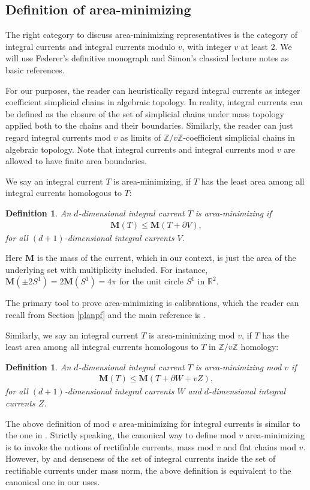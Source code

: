 \documentclass[11pt,a4paper]{amsart}
\numberwithin{equation}{section}
\newcommand{\ms}{\mathbf{M}}
\newcommand{\pd}{\partial}
\newcommand{\R}{\mathbb{R}}
\newcommand{\Z}{\mathbb{Z}}
\theoremstyle{plain}
\newtheorem{defn}[exam]{Definition}
\theoremstyle{definition}
\numberwithin{equation}{subsection}
\begin{document}
\subsection{Definition of area-minimizing}
	The right category to discuss area-minimizing representatives is the category of integral currents and integral currents modulo $v$, with integer $v$ at least $2$.  We will use Federer's definitive monograph \cite{HF} and Simon's classical lecture notes \cite{LS} as basic references. 
	
	For our purposes, the reader can heuristically regard integral currents as integer coefficient simplicial chains in algebraic topology. In reality, integral currents can be defined \cite[4.1.24]{HF} as the closure of the set of simplicial chains under mass topology applied both to the chains and their boundaries. Similarly,  the reader can just regard integral currents mod $v$ as limits of $\Z/v\Z$-coefficient simplicial chains in algebraic topology. Note that integral currents and integral currents mod $v$ are allowed to have finite area boundaries.
	
	We say an integral current $T$ is area-minimizing, if $T$ has the least area among all integral currents homologous to $T$:
	\begin{defn}\label{defnam}
		An $d$-dimensional integral current $T$ is area-minimizing if 
		\begin{align*}
			\ms(T)\le \ms(T+\pd V),
		\end{align*}for all  $(d+1)$-dimensional integral currents $V$. 
	\end{defn}
	Here $\ms$ is the mass of the current, which in our context, is just the area of the underlying set with multiplicity included. For instance, $\ms(\pm 2 S^1)=2\ms(S^1)=4\pi$ for the unit circle $S^1$ in $\R^2.$

The primary tool to prove area-minimizing is calibrations, which the reader can recall from Section \ref{planpf} and the main reference is \cite{HL}.


Similarly, we say an integral current $T$ is area-minimizing mod $v$, if $T$ has the least area among all integral currents homologous to $T$ in $\Z/v\Z$ homology:
	\begin{defn}\label{defnamv}
		An $d$-dimensional integral current $T$ is area-minimizing mod $v$ if 
		\begin{align*}
			\ms(T)\le \ms(T+\pd W+vZ),
		\end{align*}for all  $(d+1)$-dimensional integral currents $W$ and $d$-dimensional integral currents $Z$. 
	\end{defn}
The above definition of mod $v$ area-minimizing for integral currents is similar to the one in \cite[Definition 1.2]{DPHM}. Strictly speaking, the canonical way to define mod $v$ area-minimizing is to invoke the notions of rectifiable currents, mass mod $v$ and flat chains mod $v$. However, by  \cite[Corollaries 1.5, 1.6]{RY} and denseness of the set of integral currents inside the set of rectifiable currents under mass norm, the above definition is equivalent to the canonical one in our uses. 
\end{document}
